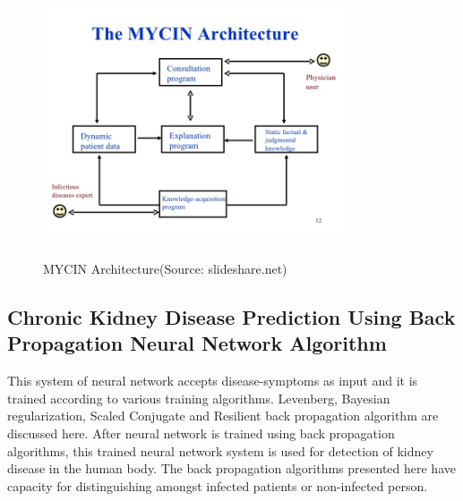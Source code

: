 \begin{figure}[H]
\begin{center}
\includegraphics[width=90mm, height = 80mm]{images/mycin.jpg}
\caption{MYCIN Architecture(Source: slideshare.net)}
\end{center}
\end{figure}
\subsection{Chronic Kidney Disease Prediction Using Back Propagation Neural Network Algorithm}
This system of neural network accepts disease-symptoms as input and it is trained according to various training algorithms. Levenberg, Bayesian regularization, Scaled Conjugate and Resilient back propagation algorithm are discussed here. After neural network is trained using back propagation algorithms, this trained neural network system is used for detection of kidney disease in the human body. The back propagation algorithms presented here have capacity for distinguishing amongst infected patients or non-infected person.
